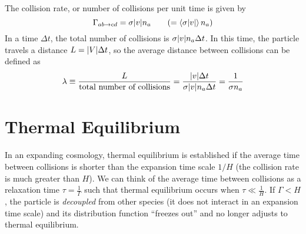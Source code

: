 \documentclass[a4paper,twoside,master.tex]{subfiles}
\begin{document}
The collision rate, or number of collisions per unit time is given by
\begin{equation}
    \Gamma_{ab \to cd} = \sigma \abs{v} n_a \qquad (=\ev{\sigma \abs{v}}n_a)
\end{equation}
In a time $ \Delta t $, the total number of collisions is $ \sigma \abs{v} n_a \Delta t $. In this time, the particle travels a distance $ L = \abs{V} \Delta t $, so the average distance between collisions can be defined as
\begin{equation}
    \lambda \equiv \frac{L}{\text{total number of collisions}} = \frac{\abs{v} \Delta t}{\sigma \abs{v} n_a \Delta t} = \frac{1}{\sigma n_a}
\end{equation}

\section{Thermal Equilibrium}\label{sec:thermal_equilibrium}

In an expanding cosmology, thermal equilibrium is established if the average time between collisions is shorter than the expansion time scale $ 1/H $ (the collision rate is much greater than $ H $). We can think of the average time between collisions as a relaxation time $ \tau = \frac{1}{\Gamma} $ such that thermal equilibrium occurs when $ \tau \ll \frac{1}{H} $. If $ \Gamma < H $, the particle is \textit{decoupled} from other species (it does not interact in an expansion time scale) and its distribution function ``freezes out'' and no longer adjusts to thermal equilibrium.
\end{document}
